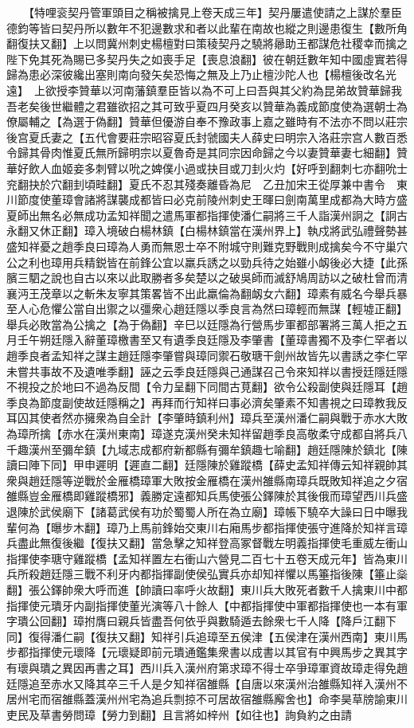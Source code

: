 　　【特哩衮契丹管軍頭目之稱被擒見上卷天成三年】契丹屢遣使請之上謀於羣臣德鈞等皆曰契丹所以數年不犯邊數求和者以此輩在南故也縱之則邊患復生【數所角翻復扶又翻】上以問冀州刺史楊檀對曰策稜契丹之驍將曏助王都謀危社稷幸而擒之陛下免其死為賜已多契丹失之如喪手足【喪息浪翻】彼在朝廷數年知中國虛實若得歸為患必深彼纔出塞則南向發矢矣恐悔之無及上乃止檀沙陀人也【楊檀後改名光遠】　上欲授李贊華以河南藩鎮羣臣皆以為不可上曰吾與其父約為昆弟故贊華歸我吾老矣後世繼體之君雖欲招之其可致乎夏四月癸亥以贊華為義成節度使為選朝士為僚屬輔之【為選于偽翻】贊華但優游自奉不豫政事上嘉之雖時有不法亦不問以莊宗後宫夏氏妻之【五代會要莊宗昭容夏氏封虢國夫人薛史曰明宗入洛莊宗宫人數百悉令歸其骨肉惟夏氏無所歸明宗以夏魯奇是其同宗因命歸之今以妻贊華妻七細翻】贊華好飲人血姬妾多刺臂以吮之婢僕小過或抉目或刀刲火灼【好呼到翻刺七亦翻吮士兖翻抉於穴翻刲頃畦翻】夏氏不忍其殘奏離昏為尼　乙丑加宋王從厚兼中書令　東川節度使董璋會諸將謀襲成都皆曰必克前陵州刺史王暉曰劍南萬里成都為大時方盛夏師出無名必無成功孟知祥聞之遣馬軍都指揮使潘仁嗣將三千人詣漢州詗之【詗古永翻又休正翻】璋入境破白楊林鎮【白楊林鎮當在漢州界上】執戍將武弘禮聲勢甚盛知祥憂之趙季良曰璋為人勇而無恩士卒不附城守則難克野戰則成擒矣今不守巢穴公之利也璋用兵精鋭皆在前鋒公宜以羸兵誘之以勁兵待之始雖小衂後必大捷【此孫臏三駟之說也自古以來以此取勝者多矣楚以之破吳師而滅舒鳩周訪以之破杜曾而清襄沔王茂章以之斬朱友寧其策畧皆不出此羸倫為翻衂女六翻】璋素有威名今舉兵暴至人心危懼公當自出禦之以彊衆心趙廷隱以季良言為然曰璋輕而無謀【輕墟正翻】舉兵必敗當為公擒之【為于偽翻】辛巳以廷隱為行營馬步軍都部署將三萬人拒之五月壬午朔廷隱入辭董璋檄書至又有遺季良廷隱及李肇書【董璋書獨不及李仁罕者以趙季良者孟知祥之謀主趙廷隱李肇嘗與璋同禦石敬瑭干劍州故皆先以書誘之李仁罕未嘗共事故不及遺唯季翻】誣之云季良廷隱與己通謀召己令來知祥以書授廷隱廷隱不視投之於地曰不過為反間【令力呈翻下同間古莧翻】欲令公殺副使與廷隱耳【趙季良為節度副使故廷隱稱之】再拜而行知祥曰事必濟矣肇素不知書視之曰璋教我反耳囚其使者然亦擁衆為自全計【李肇時鎮利州】璋兵至漢州潘仁嗣與戰于赤水大敗為璋所擒【赤水在漢州東南】璋遂克漢州癸未知祥留趙季良高敬柔守成都自將兵八千趣漢州至彌牟鎮【九域志成都府新都縣有彌牟鎮趣七喻翻】趙廷隱陳於鎮北【陳讀曰陣下同】甲申遲明【遲直二翻】廷隱陳於雞蹤橋【薛史孟知祥傳云知祥親帥其衆與趙廷隱等逆戰於金雁橋璋軍大敗按金雁橋在漢州雒縣南璋兵既敗知祥追之夕宿雒縣豈金雁橋即雞蹤橋邪】義勝定遠都知兵馬使張公鐸陳於其後俄而璋望西川兵盛退陳於武侯廟下【諸葛武侯有功於蜀蜀人所在為立廟】璋帳下驍卒大譟曰日中曝我輩何為【曝步木翻】璋乃上馬前鋒始交東川右廂馬步都指揮使張守進降於知祥言璋兵盡此無復後繼【復扶又翻】當急擊之知祥登高冢督戰左明義指揮使毛重威左衝山指揮使李瑭守雞蹤橋【孟知祥置左右衝山六營見二百七十五卷天成元年】皆為東川兵所殺趙廷隱三戰不利牙内都指揮副使侯弘實兵亦却知祥懼以馬箠指後陳【箠止橤翻】張公鐸帥衆大呼而進【帥讀曰率呼火故翻】東川兵大敗死者數千人擒東川中都指揮使元璝牙内副指揮使董光演等八十餘人【中都指揮使中軍都指揮使也一本有軍字璝公回翻】璋拊膺曰親兵皆盡吾何依乎與數騎遁去餘衆七千人降【降戶江翻下同】復得潘仁嗣【復扶又翻】知祥引兵追璋至五侯津【五侯津在漢州西南】東川馬步都指揮使元瓌降【元瓌疑即前元璝通鑑集衆書以成書以其官有中興馬步之異其字有瓌與璝之異因再書之耳】西川兵入漢州府第求璋不得士卒爭璋軍資故璋走得免趙廷隱追至赤水又降其卒三千人是夕知祥宿雒縣【自唐以來漢州治雒縣知祥入漢州不居州宅而宿雒縣蓋漢州州宅為追兵剽掠不可居故宿雒縣廨舍也】命李昊草牓諭東川吏民及草書勞問璋【勞力到翻】且言將如梓州【如往也】詢負約之由請